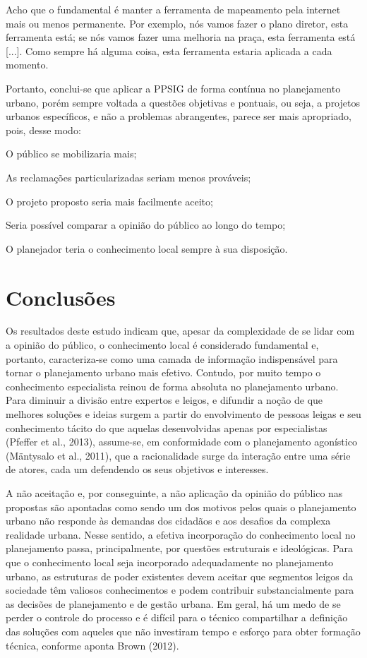 \documentclass{article}
\begin{document}
\begin{multicols}{2}
Acho que o fundamental é manter a ferramenta de mapeamento pela internet mais
ou menos permanente. Por exemplo, nós vamos fazer o plano diretor, esta
ferramenta está; se nós vamos fazer uma melhoria na praça, esta ferramenta
está [...]. Como sempre há alguma coisa, esta ferramenta
estaria aplicada a cada momento.

Portanto, conclui-se que aplicar a PPSIG de forma contínua no planejamento
urbano, porém sempre voltada a questões objetivas e pontuais, ou seja, a
projetos urbanos específicos, e não a problemas abrangentes, parece ser mais
apropriado, pois, desse modo:

O público se mobilizaria mais;

As reclamações particularizadas seriam menos prováveis;

O projeto proposto seria mais facilmente aceito;

Seria possível comparar a opinião do público ao longo do tempo;

O planejador teria o conhecimento local sempre à sua disposição.

\section{Conclusões}

Os resultados deste estudo indicam que, apesar da complexidade de se lidar com a
opinião do público, o conhecimento local é considerado fundamental e, portanto,
caracteriza-se como uma camada de informação indispensável para tornar o
planejamento urbano mais efetivo. Contudo, por muito tempo o conhecimento
especialista reinou de forma absoluta no planejamento urbano. Para diminuir a
divisão entre expertos e leigos, e difundir a noção de que melhores soluções e
ideias surgem a partir do envolvimento de pessoas leigas e seu conhecimento
tácito
do que aquelas desenvolvidas apenas por especialistas (Pfeffer et al., 2013),
assume-se, em conformidade com o
planejamento agonístico (Mäntysalo et al.,
2011), que a racionalidade surge da interação entre uma série de atores,
cada um defendendo os seus objetivos e interesses.

A não aceitação e, por conseguinte, a não aplicação da opinião do público nas
propostas são apontadas como sendo um dos motivos pelos quais o planejamento
urbano
não responde às demandas dos cidadãos e aos desafios da complexa realidade
urbana.
Nesse sentido, a efetiva incorporação do conhecimento local no planejamento
passa,
principalmente, por questões estruturais e ideológicas. Para que o conhecimento
local seja incorporado adequadamente no planejamento urbano, as estruturas de
poder
existentes devem aceitar que segmentos leigos da sociedade têm valiosos
conhecimentos e podem contribuir substancialmente para as decisões de
planejamento e
de gestão urbana. Em geral, há um medo de se perder o controle do processo e é
difícil para o técnico compartilhar a definição das soluções com aqueles que não
investiram tempo e esforço para obter formação técnica, conforme aponta Brown
(2012).


\end{multicols}
\end{document}
